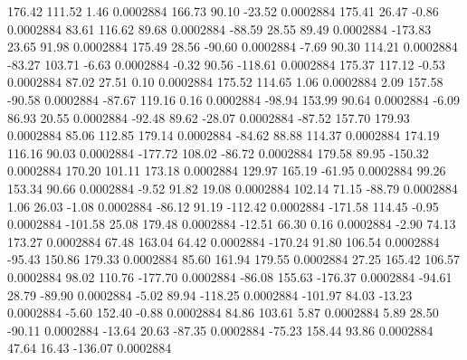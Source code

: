       176.42      111.52        1.46     0.0002884
      166.73       90.10      -23.52     0.0002884
      175.41       26.47       -0.86     0.0002884
       83.61      116.62       89.68     0.0002884
      -88.59       28.55       89.49     0.0002884
     -173.83       23.65       91.98     0.0002884
      175.49       28.56      -90.60     0.0002884
       -7.69       90.30      114.21     0.0002884
      -83.27      103.71       -6.63     0.0002884
       -0.32       90.56     -118.61     0.0002884
      175.37      117.12       -0.53     0.0002884
       87.02       27.51        0.10     0.0002884
      175.52      114.65        1.06     0.0002884
        2.09      157.58      -90.58     0.0002884
      -87.67      119.16        0.16     0.0002884
      -98.94      153.99       90.64     0.0002884
       -6.09       86.93       20.55     0.0002884
      -92.48       89.62      -28.07     0.0002884
      -87.52      157.70      179.93     0.0002884
       85.06      112.85      179.14     0.0002884
      -84.62       88.88      114.37     0.0002884
      174.19      116.16       90.03     0.0002884
     -177.72      108.02      -86.72     0.0002884
      179.58       89.95     -150.32     0.0002884
      170.20      101.11      173.18     0.0002884
      129.97      165.19      -61.95     0.0002884
       99.26      153.34       90.66     0.0002884
       -9.52       91.82       19.08     0.0002884
      102.14       71.15      -88.79     0.0002884
        1.06       26.03       -1.08     0.0002884
      -86.12       91.19     -112.42     0.0002884
     -171.58      114.45       -0.95     0.0002884
     -101.58       25.08      179.48     0.0002884
      -12.51       66.30        0.16     0.0002884
       -2.90       74.13      173.27     0.0002884
       67.48      163.04       64.42     0.0002884
     -170.24       91.80      106.54     0.0002884
      -95.43      150.86      179.33     0.0002884
       85.60      161.94      179.55     0.0002884
       27.25      165.42      106.57     0.0002884
       98.02      110.76     -177.70     0.0002884
      -86.08      155.63     -176.37     0.0002884
      -94.61       28.79      -89.90     0.0002884
       -5.02       89.94     -118.25     0.0002884
     -101.97       84.03      -13.23     0.0002884
       -5.60      152.40       -0.88     0.0002884
       84.86      103.61        5.87     0.0002884
        5.89       28.50      -90.11     0.0002884
      -13.64       20.63      -87.35     0.0002884
      -75.23      158.44       93.86     0.0002884
       47.64       16.43     -136.07     0.0002884
